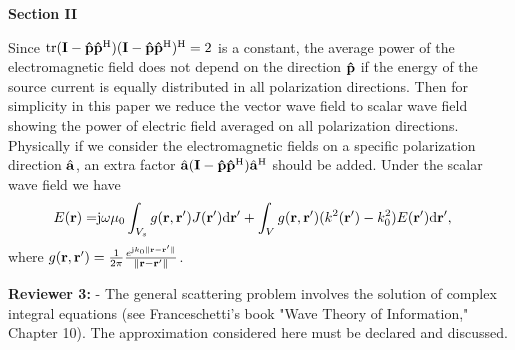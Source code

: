 \documentclass[a4paper,12pt]{article}
\begin{document}
\begin{framed}
{\bf Section II}

\setcounter{equation}{6}

{\color{red}Since ${\rm tr}({\bf I}-{\bf{\hat p}}{{{\bf{\hat p}}}^{\rm{H}}})({\bf I}-{\bf{\hat p}}{{{\bf{\hat p}}}^{\rm{H}}})^{\rm H} = 2$ is a constant, the average power of the electromagnetic field does not depend on the direction ${\bf{\hat p}}$ if the energy of the source current is equally distributed in all polarization directions. Then for simplicity in this paper we reduce the vector wave field to scalar wave field showing the power of electric field averaged on all polarization directions. Physically if we consider the electromagnetic fields on a specific polarization direction $\hat{\bf a}$, an extra factor $\hat{\bf a}({\bf{I}} - {\bf{\hat p}}{{{\bf{\hat p}}}^{\rm{H}}})\hat{\bf a}^{\rm H}$ should be added. Under the scalar wave field we have
\begin{equation}
	\begin{aligned} 
		E({\bf r}) =& {\rm j}\omega\mu_0\int_{V_s} g({\bf r},{\bf r}')J({\bf r}'){\rm d}{\bf r}' + \int_{V} g({\bf r},{\bf r}')(k^2({\bf r}')-k_0^2)  E({\bf r}'){\rm d}{\bf r}',
	\end{aligned}
	\label{equ_scattering_field_scalar}
\end{equation}		
where $g({\bf r},{\bf r}') = \frac{1}{2\pi}\frac{e^{{\rm j}k_0\| {\bf r}-{\bf r}' \|}}{\|{\bf r}-{\bf r}' \|}$.}


\end{framed}

\textbf{Reviewer 3:}
-   The general scattering problem involves the solution of complex integral equations (see Franceschetti's book "Wave Theory of Information," Chapter 10). The approximation considered here must be declared and discussed.

{}
\end{document}
